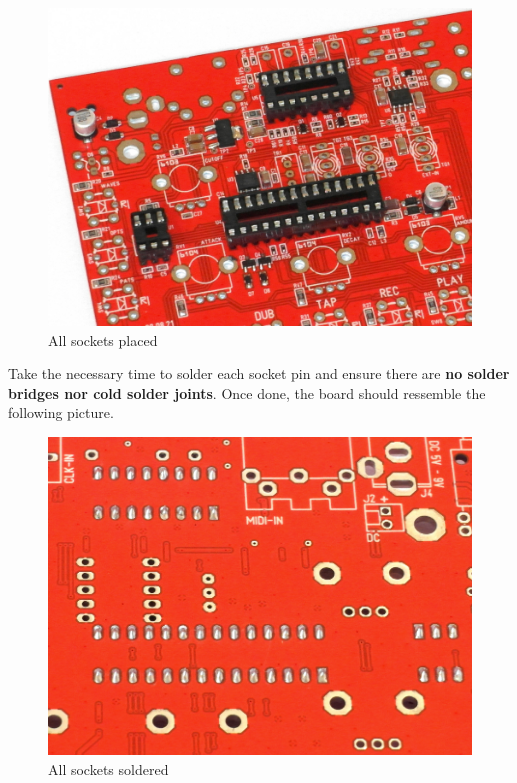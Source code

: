 \documentclass{scrartcl}
\begin{document}
\begin{figure}[!ht]
    \begin{center}
        \includegraphics[scale=0.28]{assets/pcb-sockets.jpg}
        \caption{All sockets placed}
    \end{center}
\end{figure}
Take the necessary time to solder each socket pin and ensure there are \textbf{no solder bridges nor cold solder joints}. Once done, the board should ressemble the following picture.

\begin{figure}[!ht]
    \begin{center}
        \includegraphics[scale=0.22]{assets/ic-solder.jpg}
        \caption{All sockets soldered}
    \end{center}
\end{figure}
\end{document}

